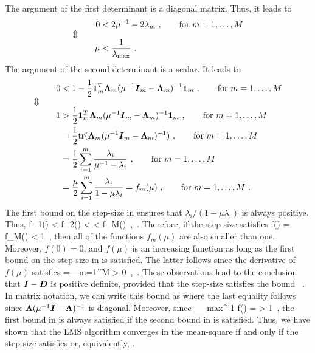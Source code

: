The argument of the first determinant is a diagonal matrix. Thus, it leads to
\begin{alignat}{2}
  && 0 &< 2\mu^{-1}-2\lambda_m\ ,\qquad \text{for }m=1,\ldots,M\\
  \ArrowBetweenLines
  && \mu &< \frac{1}{\lambda_\textup{max}}\ .
  \label{eq:app_lms_u1}
\end{alignat}
The argument of the second determinant is a scalar. It leads to
\begin{alignat}{2}
  && 0 &< 1-\frac{1}{2}\vect{1}_m^T\vect{\Lambda}_m(\mu^{-1}\vect{I}_m-\vect{\Lambda}_m)^{-1}\vect{1}_m\ ,\qquad \text{for }m=1,\ldots,M\\
  \ArrowBetweenLines
  && 1 &> \frac{1}{2}\vect{1}_m^T\vect{\Lambda}_m(\mu^{-1}\vect{I}_m-\vect{\Lambda}_m)^{-1}\vect{1}_m\ ,\qquad \text{for }m=1,\ldots,M\\
  && &= \frac{1}{2}\tr{\vect{\Lambda}_m(\mu^{-1}\vect{I}_m-\vect{\Lambda}_m)^{-1}}\ ,\qquad \text{for }m=1,\ldots,M\\
  && &= \frac{1}{2}\sum_{i=1}^m\frac{\lambda_i}{\mu^{-1}-\lambda_i}\ ,\qquad \text{for }m=1,\ldots,M\\
  && &= \frac{\mu}{2}\sum_{i=1}^m\frac{\lambda_i}{1-\mu\lambda_i} = f_m(\mu)\ ,\qquad \text{for }m=1,\ldots,M\ .
\end{alignat}
The first bound on the step-size in  ensures that $\lambda_i/(1-\mu\lambda_i)$ is always positive. Thus,
\bmath
  f_1(\mu) < f_2(\mu) < \cdots < f_M(\mu)\ ,\qquad{}\mu{}\ .
\emath
Therefore, if the step-size satisfies
\bmath
  f(\mu) = f_M(\mu) < 1\ ,
\emath
then all of the functions $f_m(\mu)$ are also smaller than one. Moreover, $f(0) = 0$, and $f(\mu)$ is an increasing function as long as the first bound on the step-size in  is satisfied. The latter follows since the derivative of $f(\mu)$ satisfies
\bmath
   = \sum_{m=1}^M > 0\ ,\qquad{}\mu{}\ .
\emath
These observations lead to the conclusion that $\boldsymbol{I} - \boldsymbol{D}$ is positive definite, provided that the step-size satisfies the bound
\bmath
  \ .
  \label{eq:app_lms_u2}
\emath
In matrix notation, we can write this bound as
\bmath
  \label{eq:app_lms_u2_matrix}
\emath
where the last equality follows since $\boldsymbol{\Lambda}(\mu^{-1}\boldsymbol{I}-\boldsymbol{\Lambda})^{-1}$ is diagonal. Moreover, since
\bmath
  \lim_{\mu\to \lambda_\textup{max}^{-1}} f(\mu) = \infty > 1\ ,
\emath
the first bound in  is always satisfied if the second bound in  is satisfied. Thus, we have shown that the LMS algorithm converges in the mean-square if and only if the step-size satisfies  or, equivalently, .


